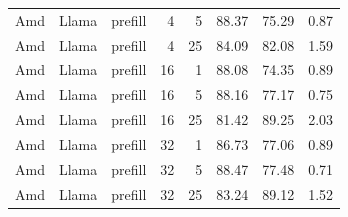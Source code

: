 \begin{tabular}{lllrrrrr}
Amd & Llama & prefill & 4 & 5 & 88.37 & 75.29 & 0.87 \\
Amd & Llama & prefill & 4 & 25 & 84.09 & 82.08 & 1.59 \\
Amd & Llama & prefill & 16 & 1 & 88.08 & 74.35 & 0.89 \\
Amd & Llama & prefill & 16 & 5 & 88.16 & 77.17 & 0.75 \\
Amd & Llama & prefill & 16 & 25 & 81.42 & 89.25 & 2.03 \\
Amd & Llama & prefill & 32 & 1 & 86.73 & 77.06 & 0.89 \\
Amd & Llama & prefill & 32 & 5 & 88.47 & 77.48 & 0.71 \\
Amd & Llama & prefill & 32 & 25 & 83.24 & 89.12 & 1.52 \\
\hline
\end{tabular}
